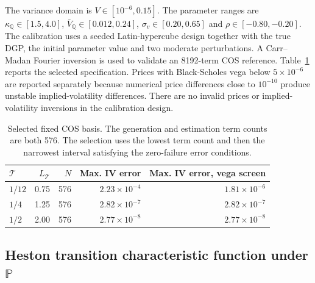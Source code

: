 \documentclass[11pt,a4paper,notitlepage]{article}
\numberwithin{equation}{section}
\begin{document}
The variance domain is \(V\in[10^{-6},0.15]\). The parameter ranges are \(\kappa_{\mathbb Q}\in[1.5,4.0]\), \(\bar V_{\mathbb Q}\in[0.012,0.24]\), \(\sigma_v\in[0.20,0.65]\) and \(\rho\in[-0.80,-0.20]\). The calibration uses a seeded Latin-hypercube design together with the true DGP, the initial parameter value and two moderate perturbations. A Carr--Madan Fourier inversion is used to validate an 8192-term COS reference. Table~\ref{tab:app_fixed_cos_calibration} reports the selected specification. Prices with Black-Scholes vega below \(5\times10^{-6}\) are reported separately because numerical price differences close to \(10^{-10}\) produce unstable implied-volatility differences. There are no invalid prices or implied-volatility inversions in the calibration design.

\begin{table}[H]
\centering
\begin{tabular}{lrrrr}
\toprule
\(\mathcal T\) & \(L_{\mathcal T}\) & \(N\) & Max. IV error & Max. IV error, vega screen \\
\midrule
\(1/12\) & 0.75 & 576 & \(2.23\times10^{-4}\) & \(1.81\times10^{-6}\) \\
\(1/4\)  & 1.25 & 576 & \(2.82\times10^{-7}\) & \(2.82\times10^{-7}\) \\
\(1/2\)  & 2.00 & 576 & \(2.77\times10^{-8}\) & \(2.77\times10^{-8}\) \\
\bottomrule
\end{tabular}
\caption{Selected fixed COS basis. The generation and estimation term counts are both 576. The selection uses the lowest term count and then the narrowest interval satisfying the zero-failure error conditions.}
\label{tab:app_fixed_cos_calibration}
\end{table}
\subsection{Heston transition characteristic function under \(\mathbb P\)}
\end{document}
